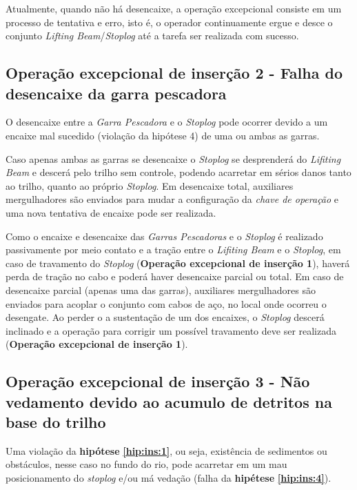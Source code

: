 Atualmente, quando não há desencaixe, a operação excepcional consiste em um
processo de tentativa e erro, isto é, o operador continuamente ergue e desce o
conjunto \emph{Lifting Beam}/\emph{Stoplog} até a tarefa ser realizada com
sucesso.


\subsection{Operação excepcional de inserção 2 - Falha do desencaixe da garra pescadora}
\label{op:ins:1}

O desencaixe entre a \emph{Garra Pescadora} e o \emph{Stoplog} pode ocorrer
devido a um encaixe mal sucedido (violação da hipótese 4) de uma ou ambas as
garras.

Caso apenas ambas as garras se desencaixe o \emph{Stoplog} se desprenderá do
\emph{Lifiting Beam} e descerá pelo trilho sem controle, podendo acarretar em
sérios danos tanto ao trilho, quanto ao próprio \emph{Stoplog}. Em desencaixe
total, auxiliares mergulhadores são enviados para mudar a configuração da
\emph{chave de operação} e uma nova tentativa de encaixe pode ser realizada.

Como o encaixe e desencaixe das \emph{Garras Pescadoras} e o \emph{Stoplog} é
realizado passivamente por meio contato e a tração entre o \emph{Lifiting Beam}
e o \emph{Stoplog}, em caso de travamento do \emph{Stoplog} (\textbf{Operação
excepcional de inserção 1}), haverá perda de tração no cabo e poderá haver
desencaixe parcial ou total. Em caso de desencaixe parcial (apenas uma das
garras), auxiliares mergulhadores são enviados para acoplar o conjunto com cabos
de aço, no local onde ocorreu o desengate. Ao perder o a sustentação de um dos
encaixes, o \emph{Stoplog} descerá inclinado e a operação para corrigir um
possível travamento deve ser realizada (\textbf{Operação excepcional de inserção
1}).

\subsection{Operação excepcional de inserção 3 - Não vedamento devido ao acumulo de detritos na base do trilho}
 
Uma violação da \textbf{hipótese} \textbf{\ref{hip:ins:1}}, ou seja, existência
de sedimentos ou obstáculos, nesse caso no fundo do rio, pode acarretar em um mau posicionamento do
\emph{stoplog} e/ou má vedação (falha da \textbf{hipétese} \textbf{\ref{hip:ins:4}}).

